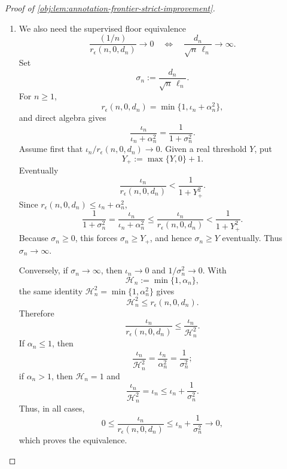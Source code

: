 \documentclass[11pt]{article}
\begin{document}
\begin{proof}[Proof of \cref{obj:lem:annotation-frontier-strict-improvement}]
\begin{enumerate}
Conversely, assume
\[
\frac{\iota_n}{\mathcal R^0_n}\to0,
\qquad
\frac{\beta_n}{\mathcal H_n}\to0.
\]
Then \(\beta_n^2/\mathcal H_n^2\to0\), and since
\(\mathcal H_n^2\le\mathcal R^0_n\),
\[
0\le
\frac{\beta_n^2}{\mathcal R^0_n}
\le
\frac{\beta_n^2}{\mathcal H_n^2}
\to0.
\]
Finally,
\[
0\le
\frac{\mathcal R_n}{\mathcal R^0_n}
\le
\frac{\iota_n+\beta_n^2}{\mathcal R^0_n}
=
\frac{\iota_n}{\mathcal R^0_n}
+
\frac{\beta_n^2}{\mathcal R^0_n}
\to0,
\]
which is exactly \(\mathcal R_n=o(\mathcal R^0_n)\).

\item
We also need the supervised floor equivalence
\[
\frac{(1/n)}{r_\epsilon(n,0,d_n)}\to0
\quad\Longleftrightarrow\quad
\frac{d_n}{\sqrt n\,\ell_n}\to\infty.
\]
Set
\[
\sigma_n:=\frac{d_n}{\sqrt n\,\ell_n}.
\]
For \(n\ge1\),
\[
r_\epsilon(n,0,d_n)=\min\{1,\iota_n+\alpha_n^2\},
\]
and direct algebra gives
\[
\frac{\iota_n}{\iota_n+\alpha_n^2}
=
\frac1{1+\sigma_n^2}.
\]
Assume first that \(\iota_n/r_\epsilon(n,0,d_n)\to0\).  Given a real threshold \(Y\), put
\[
Y_+:=\max\{Y,0\}+1.
\]
Eventually
\[
\frac{\iota_n}{r_\epsilon(n,0,d_n)}
<
\frac1{1+Y_+^2}.
\]
Since \(r_\epsilon(n,0,d_n)\le \iota_n+\alpha_n^2\),
\[
\frac1{1+\sigma_n^2}
=
\frac{\iota_n}{\iota_n+\alpha_n^2}
\le
\frac{\iota_n}{r_\epsilon(n,0,d_n)}
<
\frac1{1+Y_+^2}.
\]
Because \(\sigma_n\ge0\), this forces \(\sigma_n\ge Y_+\), and hence \(\sigma_n\ge Y\) eventually.  Thus \(\sigma_n\to\infty\).

Conversely, if \(\sigma_n\to\infty\), then \(\iota_n\to0\) and \(1/\sigma_n^2\to0\).  With
\[
\mathcal H_n:=\min\{1,\alpha_n\},
\]
the same identity \(\mathcal H_n^2=\min\{1,\alpha_n^2\}\) gives
\[
\mathcal H_n^2\le r_\epsilon(n,0,d_n).
\]
Therefore
\[
\frac{\iota_n}{r_\epsilon(n,0,d_n)}
\le
\frac{\iota_n}{\mathcal H_n^2}.
\]
If \(\alpha_n\le1\), then
\[
\frac{\iota_n}{\mathcal H_n^2}
=
\frac{\iota_n}{\alpha_n^2}
=
\frac1{\sigma_n^2};
\]
if \(\alpha_n>1\), then \(\mathcal H_n=1\) and
\[
\frac{\iota_n}{\mathcal H_n^2}
=
\iota_n
\le
\iota_n+\frac1{\sigma_n^2}.
\]
Thus, in all cases,
\[
0\le
\frac{\iota_n}{r_\epsilon(n,0,d_n)}
\le
\iota_n+\frac1{\sigma_n^2}\to0,
\]
which proves the equivalence.


\end{enumerate}
\end{proof}
\end{document}
